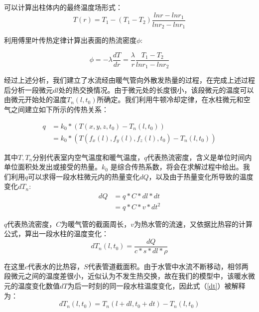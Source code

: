 \documentclass{my_paper}
\begin{document}
可以计算出柱体内的最终温度场形式：
\begin{equation}
    T(r) = T_1 - (T_1-T_2)\frac{lnr - lnr_1}{lnr_2 - lnr_1}
\end{equation}

利用傅里叶传热定律计算出表面的热流密度$\phi$:

\begin{equation}
    \phi = -\lambda \frac{dT}{dr} = \frac{\lambda}{r}\frac{T_1-T_2}{lnr_1-lnr_2}
\end{equation}

经过上述分析，我们建立了水流经由暖气管向外散发热量的过程，在完成上述过程后分析一段微元$dl$处的热交换情况。由于微元处的长度很小，该段微元的温度可以由微元开始处的温度$T_n(l,t_0)$所确定。我们利用牛顿冷却定律\cite{1}，在水柱微元和空气之间建立如下所示的传热关系：

\begin{equation}
    \begin{aligned}
        q&= k_0*(T(x,y,z,t_0)-T_n(l,t_0))\\
        &= k_0 * (T(f_x(l),f_y(l),f_z(l),t_0)-T_n(l,t_0))
    \end{aligned}
    \label{11}
\end{equation}

其中$T,T_n$分别代表室内空气温度和暖气温度，$q$代表热流密度，含义是单位时间内单位面积处发出或接受的热量。$k_0$ 是综合传热系数，将会在求解过程中给出。我们利用$ q $可以求得一段水柱微元内的热量变化$dQ$，以及由于热量变化所导致的温度变化$dT_n$:
\begin{equation}
    \begin{aligned}
        dQ &= q* C * dl * dt\\
        &= q* C * v * dt^2
    \end{aligned}
    \label{12}
\end{equation}

$q$代表热流密度，$C$为暖气管的截面周长，$v$为热水管的流速，又依据比热容的计算公式，算出一段水柱的温度变化：
\begin{equation}
    dT_n(l,t_0) = \frac{dQ}{c*s*dl*\rho}
    \label{dt}
\end{equation}

在这里$c$代表水的比热容，$S$代表管道截面积。由于水管中水流不断移动，相邻两段微元之间的温度差很小，近似认为不发生热交换，故在我们的模型中，该暖水微元的温度变化数值$dT$为后一时刻的同一段水柱温度变化，因此式（\ref{dt}）被解释为：
\begin{equation}
dT_n(l,t_0) = T_n(l+dl,t_0+dt) - T_n(l,t_0)
\label{14}
\end{equation}
\end{document}
